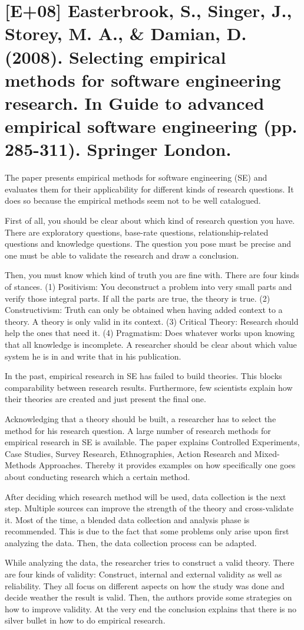 \documentclass[a4paper,12pt,english]{scrartcl}
\newcommand{\papertitle}[2]{
	\section{[#1] #2}
}
\begin{document}
\newpage

\papertitle{E+08}{Easterbrook, S., Singer, J., Storey, M. A., \& Damian, D. (2008). Selecting empirical methods for software engineering research. In Guide to advanced empirical software engineering (pp. 285-311). Springer London.}

The paper presents empirical methods for software engineering (SE) and evaluates them for their applicability for different kinds of research questions. It does so because the empirical methods seem not to be well catalogued.

First of all, you should be clear about which kind of research question you have. There are exploratory questions, base-rate questions, relationship-related questions and knowledge questions. The question you pose must be precise and one must be able to validate the research and draw a conclusion.

Then, you must know which kind of truth you are fine with. There are four kinds of stances. (1) Positivism: You deconstruct a problem into very small parts and verify those integral parts. If all the parts are true, the theory is true. (2) Constructivism: Truth can only be obtained when having added context to a theory. A theory is only valid in its context. (3) Critical Theory: Research should help the ones that need it. (4) Pragmatism: Does whatever works upon knowing that all knowledge is incomplete. A researcher should be clear about which value system he is in and write that in his publication.

In the past, empirical research in SE has failed to build theories. This blocks comparability between research results. Furthermore, few scientists explain how their theories are created and just present the final one.

Acknowledging that a theory should be built, a researcher has to select the method for his research question. A large number of research methods for empirical research in SE is available. The paper explains Controlled Experiments, Case Studies, Survey Research, Ethnographies, Action Research and Mixed-Methods Approaches. Thereby it provides examples on how specifically one goes about conducting research which a certain method.

After deciding which research method will be used, data collection is the next step. Multiple sources can improve the strength of the theory and cross-validate it. Most of the time, a blended data collection and analysis phase is recommended. This is due to the fact that some problems only arise upon first analyzing the data. Then, the data collection process can be adapted.

While analyzing the data, the researcher tries to construct a valid theory. There are four kinds of validity: Construct, internal and external validity as well as reliability. They all focus on different aspects on how the study was done and decide weather the result is valid. Then, the authors provide some strategies on how to improve validity. At the very end the conclusion explains that there is no silver bullet in how to do empirical research.
\end{document}
